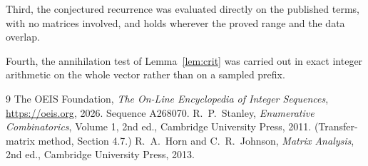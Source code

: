 \documentclass[11pt,a4paper]{article}
\theoremstyle{plain}
\theoremstyle{definition}
\begin{document}
Third, the conjectured recurrence was evaluated directly on the published terms, with no
matrices involved, and holds wherever the proved range and the data overlap.

Fourth, the annihilation test of Lemma~\ref{lem:crit} was carried out in exact integer
arithmetic on the whole vector rather than on a sampled prefix.

\begin{thebibliography}{9}
 The OEIS Foundation, \emph{The On-Line Encyclopedia of Integer
Sequences}, \url{https://oeis.org}, 2026. Sequence A268070.
 R.~P.~Stanley, \emph{Enumerative Combinatorics}, Volume 1, 2nd ed.,
Cambridge University Press, 2011. (Transfer-matrix method, Section 4.7.)
 R.~A.~Horn and C.~R.~Johnson, \emph{Matrix Analysis}, 2nd ed., Cambridge
University Press, 2013.
\end{thebibliography}
\end{document}
